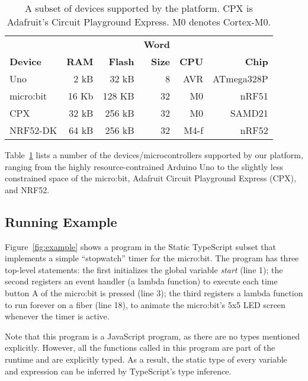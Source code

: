 \begin{table}[]
\centering
\begin{tabular}{|l|r|r|r|r|r|}
\hline
            &          &            & \bf{Word} &          &             \\
\bf{Device} & \bf{RAM} & \bf{Flash} & \bf{Size} & \bf{CPU} & \bf{Chip}   \\ \hline
Uno         & 2 kB     & 32 kB      & 8         & AVR      & ATmega328P  \\ \hline
micro:bit   & 16 Kb    & 128 KB     & 32        & M0       & nRF51       \\ \hline
CPX         & 32 kB    & 256 kB     & 32        & M0       & SAMD21      \\ \hline
NRF52-DK    & 64 kB    & 256 kB     & 32        & M4-f     & nRF52     \\ \hline
\end{tabular}
\caption{\label{table:devices}A subset of devices supported by the platform.
CPX is Adafruit's Circuit Playground Express. M0 denotes Cortex-M0.}
\end{table}

Table~\ref{table:devices} lists a number of the devices/microcontrollers supported by our platform, 
ranging from the highly resource-contrained Arduino Uno to the slightly less constrained space of
the micro:bit, Adafruit Circuit Playground Express (CPX), and NRF52.

\subsection{Running Example}

Figure~\ref{fig:example} shows a program in the Static
TypeScript subset that implements a simple ``stopwatch'' timer
for the micro:bit.
The program has three top-level statements:
the first initializes the global variable \emph{start} (line 1); the
second registers an event handler (a lambda function) to execute
each time button A of the micro:bit is pressed (line 3); the
third registers a lambda function to run forever on a fiber (line 18),
to animate the micro:bit's 5x5 LED screen whenever the timer is active.

Note that this program is a JavaScript program, as there are no
types mentioned explicitly. However, all the functions called in
this program are part of the runtime and are explicitly
typed.  As a result, the static type of every variable and expression
can be inferred by TypeScript's type inference.

